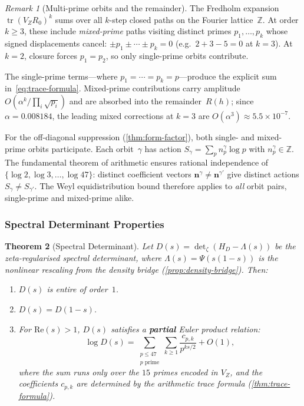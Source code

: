 \documentclass[11pt,a4paper]{article}
\theoremstyle{plain}
\newtheorem{theorem}{Theorem}[section]
\theoremstyle{remark}
\newtheorem{remark}[theorem]{Remark}
\newcommand{\Z}{\mathbb{Z}}
\begin{document}
\begin{remark}[Multi-prime orbits and the remainder]
\label{rem:multi-prime-orbits}
The Fredholm expansion $\operatorname{tr}(V_Z R_0)^k$ sums over all
$k$-step closed paths on the Fourier lattice~$\Z$.  At order $k\geq 3$,
these include \emph{mixed-prime} paths visiting distinct primes
$p_1,\ldots,p_k$ whose signed displacements cancel:
$\pm p_1 \pm \cdots \pm p_k = 0$
(e.g.\ $2+3-5=0$ at $k=3$).  At $k=2$, closure forces $p_1=p_2$,
so only single-prime orbits contribute.

The single-prime terms---where $p_1=\cdots=p_k=p$---produce the
explicit sum in~\cref{eq:trace-formula}.  Mixed-prime contributions
carry amplitude $O(\alpha^k/\prod_i\sqrt{p_i})$ and are absorbed into
the remainder~$R(h)$; since $\alpha=0.008184$, the leading mixed
corrections at $k=3$ are $O(\alpha^3)\approx 5.5\times 10^{-7}$.

For the off-diagonal suppression (\cref{thm:form-factor}), both
single- and mixed-prime orbits participate.  Each orbit~$\gamma$ has
action $S_\gamma = \sum_p n_p^\gamma\log p$ with $n_p^\gamma\in\Z$.
The fundamental theorem of arithmetic ensures rational independence
of $\{\log 2,\log 3,\ldots,\log 47\}$: distinct coefficient vectors
$\mathbf{n}^\gamma\neq\mathbf{n}^{\gamma'}$ give distinct actions
$S_\gamma\neq S_{\gamma'}$.  The Weyl equidistribution bound therefore
applies to \emph{all} orbit pairs, single-prime and mixed-prime alike.
\end{remark}

\subsubsection{Spectral Determinant Properties}
\label{sec:spectral-det}

\begin{theorem}[Spectral Determinant]\label{thm:spectral-det}
Let $D(s) = \det_\zeta(H_D - \Lambda(s))$ be the zeta-regularised
spectral determinant, where $\Lambda(s)=\Psi(s(1{-}s))$ is the
nonlinear rescaling from the density bridge
(\cref{prop:density-bridge}).  Then:
\begin{enumerate}[nosep,label=(\alph*)]
  \item $D(s)$ is entire of order~$1$.
  \item $D(s) = D(1-s)$.
  \item For $\mathrm{Re}(s)>1$, $D(s)$ satisfies a \textbf{partial}
        Euler product relation:
        \begin{equation}\label{eq:euler-relation}
          \log D(s)
          = \sum_{\substack{p\leq 47\\p\text{ prime}}} \sum_{k\geq 1}
            \frac{c_{p,k}}{p^{ks/2}} + O(1),
        \end{equation}
        where the sum runs only over the $15$ primes encoded in $V_Z$,
        and the coefficients $c_{p,k}$ are determined by the
        arithmetic trace formula (\cref{thm:trace-formula}).
\end{enumerate}
\end{theorem}
\end{document}
